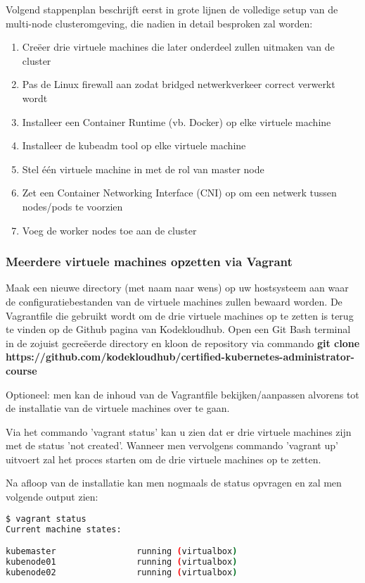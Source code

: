 Volgend stappenplan beschrijft eerst in grote lijnen de volledige setup van de multi-node clusteromgeving, die nadien in detail besproken zal worden: 
\begin{enumerate}
    \item Creëer drie virtuele machines die later onderdeel zullen uitmaken van de cluster
    \item Pas de Linux firewall aan zodat bridged netwerkverkeer correct verwerkt wordt
    \item Installeer een Container Runtime (vb. Docker) op elke virtuele machine    
    \item Installeer de kubeadm tool op elke virtuele machine
    \item Stel één virtuele machine in met de rol van master node
    \item Zet een Container Networking Interface (CNI) op om een netwerk tussen nodes/pods te voorzien
    \item Voeg de worker nodes toe aan de cluster
\end{enumerate}

\subsubsection{Meerdere virtuele machines opzetten via Vagrant}

Maak een nieuwe directory (met naam naar wens) op uw hostsysteem aan waar de configuratiebestanden van de virtuele machines zullen bewaard worden. 
De Vagrantfile die gebruikt wordt om de drie virtuele machines op te zetten is terug te vinden op de Github pagina van Kodekloudhub. Open een Git Bash terminal in de zojuist gecreëerde directory en kloon de repository via commando {\bf git clone https://github.com/kodekloudhub/certified-kubernetes-administrator-course}

Optioneel: men kan de inhoud van de Vagrantfile bekijken/aanpassen alvorens tot de installatie van de virtuele machines over te gaan. 

Via het commando 'vagrant status' kan u zien dat er drie virtuele machines zijn met de status 'not created'. Wanneer men vervolgens commando 'vagrant up' uitvoert zal het proces starten om de drie virtuele machines op te zetten.

Na afloop van de installatie kan men nogmaals de status opvragen en zal men volgende output zien:
\begin{lstlisting}[language=bash]
$ vagrant status
Current machine states:

kubemaster                running (virtualbox)
kubenode01                running (virtualbox)
kubenode02                running (virtualbox)
\end{lstlisting}

